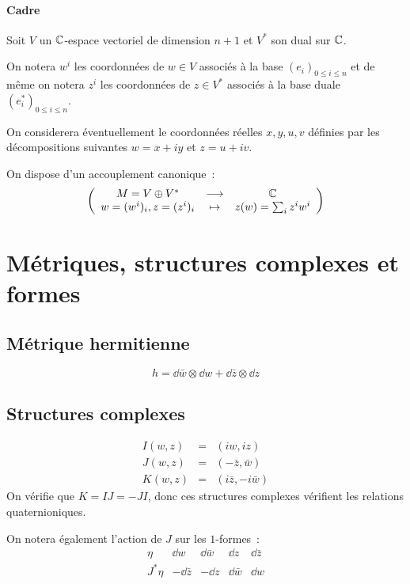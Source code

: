\documentclass[a4paper,10pt]{article}
\begin{document}
\paragraph{Cadre} Soit $V$ un $\mathbb{C}$-espace vectoriel de dimension $n+1$ et $V^*$ son dual sur $\mathbb{C}$.

On notera $w^i$ les coordonnées de $w \in V$ associés à la base $(e_i)_{0 \leq i \leq n}$ et de même on notera $z^i$ les coordonnées de $z \in V^*$ associés à la base duale $(e^*_i)_{0 \leq i \leq n}$.

On considerera éventuellement le coordonnées réelles $x,y,u,v$ définies par les décompositions suivantes $w=x+iy$ et $z=u+iv$.

On dispose d'un accouplement canonique~:
\[
\left(
\begin{array}{ccc}
M = V \oplus V^*  & \longrightarrow & \mathbb{C} \\ 
w = (w^i)_i , z = (z^i)_i & \mapsto & z(w) = \sum_i z^iw^i
\end{array} 
\right)
\]

\section{Métriques, structures complexes et formes}

\subsection{Métrique hermitienne}
\[
h = \dd \bar{w} \otimes \dd w + \dd \bar{z} \otimes \dd z
\]

\subsection{Structures complexes}
\begin{eqnarray}
I(w,z) & = & (iw,iz) \\
J(w,z) & = & (-\bar{z},\bar{w})\\
K(w,z) & = & (i\bar{z},-i\bar{w})
\end{eqnarray}
On  vérifie que $K = IJ = -JI$, donc ces structures complexes vérifient les relations quaternioniques.

On notera également l'action de $J$ sur les $1$-formes~:
\[
\begin{array}{r|cccc}
\eta & \dd w & \dd \bar{w} & \dd z  & \dd \bar{z} \\ 
J^* \eta & -\dd \bar{z} & -\dd z & \dd \bar{w} & \dd w
\end{array} 
\]
\end{document}
